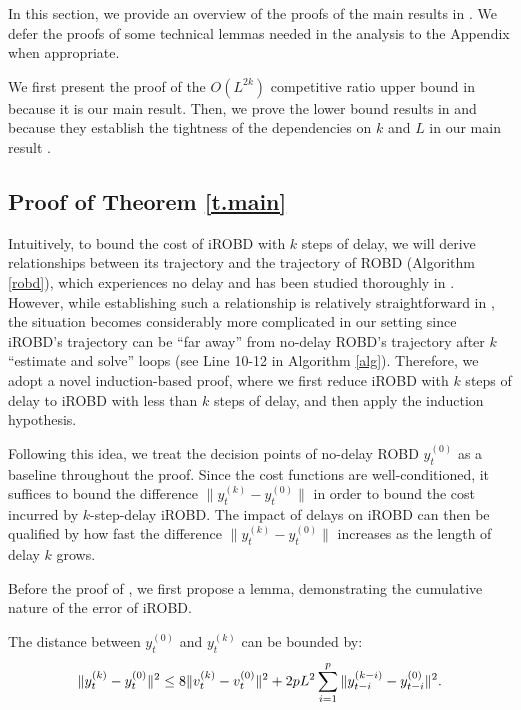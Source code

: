 In this section, we provide an overview of the proofs of the main results in .  We defer the proofs of some technical lemmas needed in the analysis to the Appendix when appropriate.

We first present the proof of the $O(L^{2k})$ competitive ratio upper bound in  because it is our main result. Then, we prove the lower bound results in  and  because they establish the tightness of the dependencies on $k$ and $L$ in our main result .

\subsection{Proof of Theorem \ref{t.main}}\label{p.t.main}
Intuitively, to bound the cost of iROBD with $k$ steps of delay, we will derive relationships between its trajectory and the trajectory of ROBD (Algorithm \ref{robd}), which experiences no delay and has been studied thoroughly in \citep{shi2020online, goel2019beyond}. However, while establishing such a relationship is relatively straightforward in \citep{shi2020online}, the situation becomes considerably more complicated in our setting since iROBD's trajectory can be ``far away'' from no-delay ROBD's trajectory after $k$ ``estimate and solve'' loops (see Line 10-12 in Algorithm \ref{alg}). Therefore, we adopt a novel induction-based proof, where we first reduce iROBD with $k$ steps of delay to iROBD with less than $k$ steps of delay, and then apply the induction hypothesis.

Following this idea, we treat the decision points of no-delay ROBD $y_t^{(0)}$ as a baseline throughout the proof. Since the cost functions are well-conditioned, it suffices to bound the difference $\|{y_t^{(k)} - y_t^{(0)}}\|$ in order to bound the cost incurred by $k$-step-delay iROBD. The impact of delays on iROBD can then be qualified by how fast the difference $\|{y_t^{(k)} - y_t^{(0)}}\|$ increases as the length of delay $k$ grows.

Before the proof of , we first propose a lemma, demonstrating the cumulative nature of the error of iROBD.

\begin{lemma}\label{l.bound2}
The distance between $y_t^{(0)}$ and $y_t^{(k)}$ can be bounded by:
\begin{align}
    \|y_t^{(k)}-y_t^{(0)}\|^2\le8\|v_t^{(k)}-v_t^{(0)}\|^2+2pL^2\sum_{i=1}^{p}\|y_{t-i}^{(k-i)}-y_{t-i}^{(0)}\|^2.\notag
\end{align}
\end{lemma}

